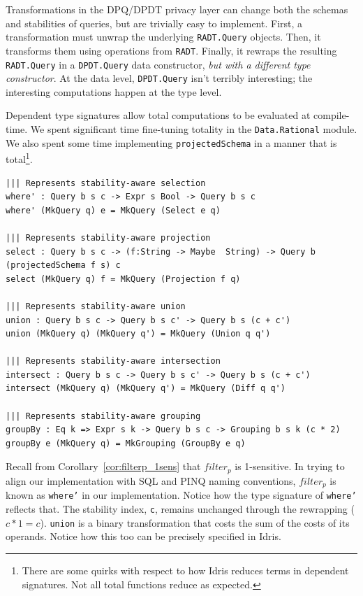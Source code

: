 \documentclass[12pt]{report}
\begin{document}
Transformations in the DPQ/DPDT privacy layer can change both the schemas and stabilities of queries, but are trivially easy to implement.
First, a transformation must unwrap the underlying \texttt{RADT.Query} objects.
Then, it transforms them using operations from \texttt{RADT}.
Finally, it rewraps the resulting \texttt{RADT.Query} in a \texttt{DPDT.Query} data constructor, \textit{but with a different type constructor}.
At the data level, \texttt{DPDT.Query} isn't terribly interesting; the interesting computations happen at the type level.

Dependent type signatures allow total computations to be evaluated at compile-time.
We spent significant time fine-tuning totality in the \texttt{Data.Rational} module.
We also spent some time implementing \texttt{projectedSchema} in a manner that is total\footnote{There are some quirks with respect to how Idris reduces terms in dependent signatures. Not all total functions reduce as expected.}.

\begin{lstlisting}[float,caption={Representing privacy-aware transformations},label={lst:transformations}]
||| Represents stability-aware selection
where' : Query b s c -> Expr s Bool -> Query b s c
where' (MkQuery q) e = MkQuery (Select e q)

||| Represents stability-aware projection
select : Query b s c -> (f:String -> Maybe  String) -> Query b (projectedSchema f s) c
select (MkQuery q) f = MkQuery (Projection f q)

||| Represents stability-aware union
union : Query b s c -> Query b s c' -> Query b s (c + c')
union (MkQuery q) (MkQuery q') = MkQuery (Union q q')

||| Represents stability-aware intersection
intersect : Query b s c -> Query b s c' -> Query b s (c + c')
intersect (MkQuery q) (MkQuery q') = MkQuery (Diff q q')

||| Represents stability-aware grouping
groupBy : Eq k => Expr s k -> Query b s c -> Grouping b s k (c * 2)
groupBy e (MkQuery q) = MkGrouping (GroupBy e q)
\end{lstlisting}

Recall from Corollary~\ref{cor:filterp_1sens} that $filter_p$ is 1-sensitive.
In trying to align our implementation with SQL and PINQ naming conventions, $filter_p$ is known as \texttt{where'} in our implementation.
Notice how the type signature of \texttt{where'} reflects that.
The stability index, \texttt{c}, remains unchanged through the rewrapping ($c * 1 = c$).
\texttt{union} is a binary transformation that costs the sum of the costs of its operands.
Notice how this too can be precisely specified in Idris.
\end{document}

